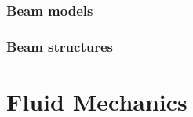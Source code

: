 \documentclass[letterpaper,10pt,english]{jupyterBook}
\begin{document}
\section{Beam models}
\label{\detokenize{ch/solids/small-displacements-statics:beam-models}}\label{\detokenize{ch/solids/small-displacements-statics:solid-mechanics-intro-small-displacements-statics-beam}}

\section{Beam structures}
\label{\detokenize{ch/solids/small-displacements-statics:beam-structures}}\label{\detokenize{ch/solids/small-displacements-statics:solid-mechanics-intro-small-displacements-statics-beam-structures}}
\sphinxstepscope


\part{Fluid Mechanics}

\sphinxstepscope
\end{document}
